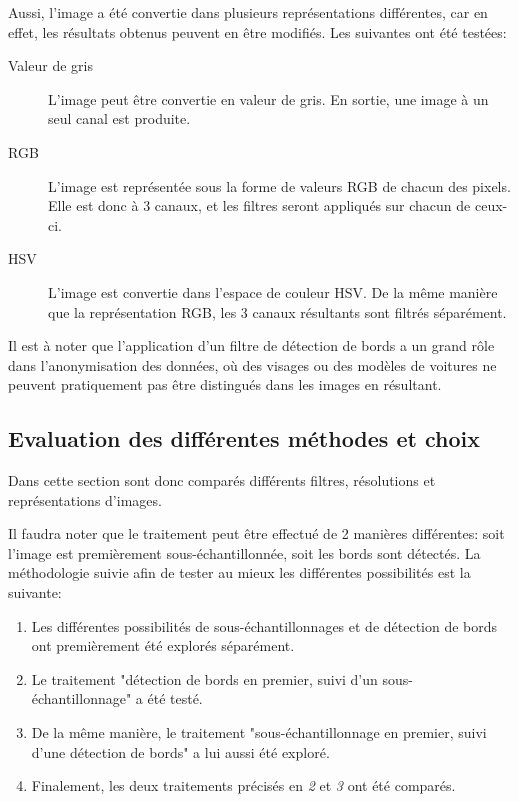 Aussi, l'image a été convertie dans plusieurs représentations différentes, car en effet, les résultats obtenus peuvent en être modifiés. Les suivantes ont été testées:
\begin{description}
    \item[Valeur de gris] L'image peut être convertie en valeur de gris. En sortie, une image à un seul canal est produite.
    \item[RGB] L'image est représentée sous la forme de valeurs RGB de chacun des pixels. Elle est donc à 3 canaux, et les filtres seront appliqués sur chacun de ceux-ci.
    \item[HSV] L'image est convertie dans l'espace de couleur HSV. De la même manière que la représentation RGB, les 3 canaux résultants sont filtrés séparément.
\end{description}

Il est à noter que l'application d'un filtre de détection de bords a un grand rôle dans l'anonymisation des données, où des visages ou des modèles de voitures ne peuvent pratiquement pas être distingués dans les images en résultant.

\subsection{Evaluation des différentes méthodes et choix}
Dans cette section sont donc comparés différents filtres, résolutions et représentations d'images. 

Il faudra noter que le traitement peut être effectué de 2 manières différentes: soit l'image est premièrement sous-échantillonnée, soit les bords sont détectés. La méthodologie suivie afin de tester au mieux les différentes possibilités est la suivante:
\begin{enumerate}
    \item Les différentes possibilités de sous-échantillonnages et de détection de bords ont premièrement été explorés séparément.
    \item Le traitement "détection de bords en premier, suivi d'un sous-échantillonnage" a été testé.
    \item De la même manière, le traitement "sous-échantillonnage en premier, suivi d'une détection de bords" a lui aussi été exploré.
    \item Finalement, les deux traitements précisés en \textit{2} et \textit{3} ont été comparés.
\end{enumerate}

